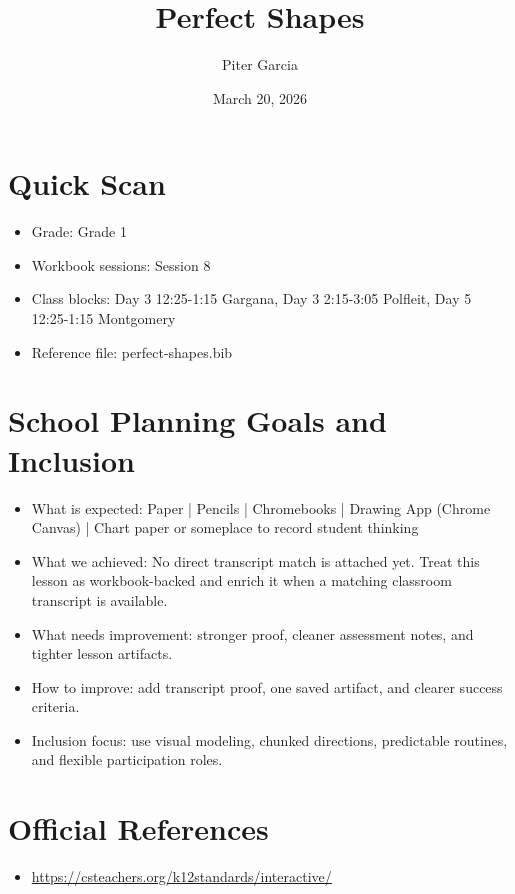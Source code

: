 \documentclass[11pt]{article}
\title{Perfect Shapes}
\author{Piter Garcia}
\date{March 20, 2026}
\begin{document}
\maketitle
\section*{Quick Scan}
\begin{itemize}[leftmargin=*]
\item Grade: Grade 1
\item Workbook sessions: Session 8
\item Class blocks: Day 3 12:25-1:15 Gargana, Day 3 2:15-3:05 Polfleit, Day 5 12:25-1:15 Montgomery
\item Reference file: perfect-shapes.bib
\end{itemize}
\section*{School Planning Goals and Inclusion}
\begin{itemize}[leftmargin=*]
\item What is expected: Paper | Pencils | Chromebooks | Drawing App (Chrome Canvas) | Chart paper or someplace to record student thinking
\item What we achieved: No direct transcript match is attached yet. Treat this lesson as workbook-backed and enrich it when a matching classroom transcript is available.
\item What needs improvement: stronger proof, cleaner assessment notes, and tighter lesson artifacts.
\item How to improve: add transcript proof, one saved artifact, and clearer success criteria.
\item Inclusion focus: use visual modeling, chunked directions, predictable routines, and flexible participation roles.
\end{itemize}
\section*{Official References}
\begin{itemize}[leftmargin=*]
\item \url{https://csteachers.org/k12standards/interactive/}

\end{itemize}
\end{document}
